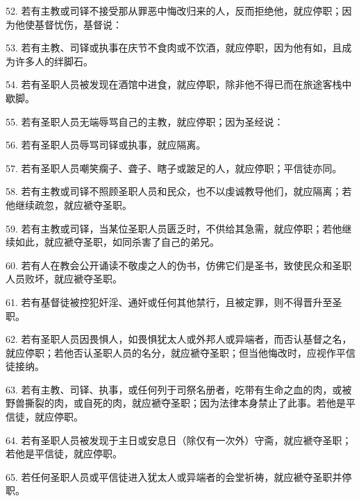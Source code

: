 52. 若有主教或司铎不接受那从罪恶中悔改归来的人，反而拒绝他，就应停职；因为他使基督忧伤，基督说： \par

53. 若有主教、司铎或执事在庆节不食肉或不饮酒，就应停职，因为他有如，且成为许多人的绊脚石。 \par

54. 若有圣职人员被发现在酒馆中进食，就应停职，除非他不得已而在旅途客栈中歇脚。\par

55. 若有圣职人员无端辱骂自己的主教，就应停职；因为圣经说： \par

56. 若有圣职人员辱骂司铎或执事，就应隔离。\par

57. 若有圣职人员嘲笑瘸子、聋子、瞎子或跛足的人，就应停职；平信徒亦同。\par

58. 若有主教或司铎不照顾圣职人员和民众，也不以虔诚教导他们，就应隔离；若他继续疏忽，就应褫夺圣职。\par

59. 若有主教或司铎，当某位圣职人员匮乏时，不供给其急需，就应停职；若他继续如此，就应褫夺圣职，如同杀害了自己的弟兄。\par

60. 若有人在教会公开诵读不敬虔之人的伪书，仿佛它们是圣书，致使民众和圣职人员败坏，就应褫夺圣职。\par

61. 若有基督徒被控犯奸淫、通奸或任何其他禁行，且被定罪，则不得晋升至圣职。\par

62. 若有圣职人员因畏惧人，如畏惧犹太人或外邦人或异端者，而否认基督之名，就应停职；若他否认圣职人员的名分，就应褫夺圣职；但当他悔改时，应视作平信徒接纳。\par

63. 若有主教、司铎、执事，或任何列于司祭名册者，吃带有生命之血的肉，或被野兽撕裂的肉，或自死的肉，就应褫夺圣职；因为法律本身禁止了此事。若他是平信徒，就应停职。\par

64. 若有圣职人员被发现于主日或安息日（除仅有一次外）守斋，就应褫夺圣职；若他是平信徒，就应停职。\par

65. 若任何圣职人员或平信徒进入犹太人或异端者的会堂祈祷，就应褫夺圣职并停职。\par

